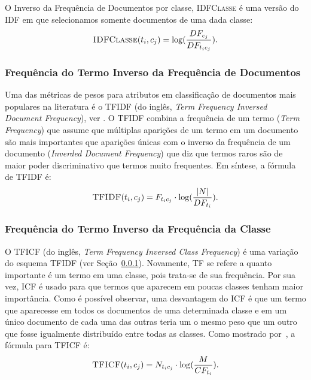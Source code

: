 O Inverso da Frequência de Documentos por classe, \textsc{IDFClasse} é uma versão do \textsc{IDF} em que selecionamos somente documentos de uma dada classe:
\begin{equation}\label{eqn::tficf}
 \textsc{IDFClasse}(t_i,c_j) = \log( \frac{DF_{c_j}} {DF_{t_ic_j} }).
\end{equation}



\subsubsection{Frequência do Termo Inverso da Frequência de Documentos}%
\label{subsubsection::tfidf}

Uma das métricas de pesos para atributos em classificação de documentos mais populares na literatura é o \textsc{TFIDF} (do inglês, \textit{Term Frequency Inversed Document Frequency}), ver \cite{Salton88}. O \textsc{TFIDF} combina a frequência de um termo (\textit{Term Frequency}) que assume que múltiplas aparições de um termo em um documento são mais importantes que aparições únicas com o inverso da frequência de um documento (\textit{Inverded Document Frequency}) que diz que termos raros são de maior poder discriminativo que termos muito frequentes. Em síntese, a fórmula de \textsc{TFIDF} é:
\begin{equation}\label{eqn::tficf}
 \textsc{TFIDF}(t_i, c_j) =  F_{t_ic_j} \cdot \log( \frac{|N|} {DF_{t_i}} ).
\end{equation}

\subsubsection{Frequência do Termo Inverso da Frequência da Classe}%
\label{subsubsection::tficf}

O \textsc{TFICF} (do inglês, \textit{Term Frequency Inversed Class Frequency}) é uma variação do esquema \textsc{TFIDF} (ver Seção~\ref{subsubsection::tfidf}). Novamente, \textsc{TF} se refere a quanto importante é um termo em uma classe, pois trata-se de sua frequência. Por sua vez, \textsc{ICF} é usado para que termos que aparecem em poucas classes tenham maior importância.
Como é possível observar, uma desvantagem do \textsc{ICF} é que um termo que aparecesse em todos os documentos de uma determinada classe e em um único documento de cada uma das outras teria um o mesmo peso que um outro que fosse igualmente distribuído entre todas as classes. 
Como mostrado por~\cite{ChihHow04}, a fórmula para \textsc{TFICF} é:
\begin{equation}\label{eqn::tficf}
 \textsc{TFICF}(t_i, c_j) = N_{t_ic_j} \cdot \log( \frac{M}{CF_{t_i}} ).
\end{equation}

